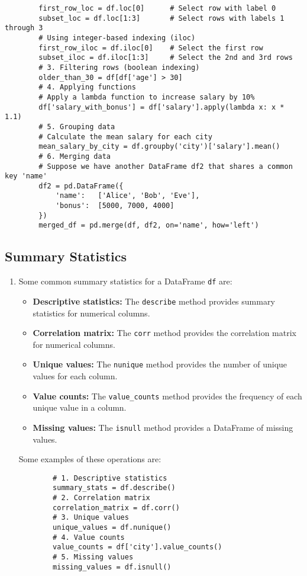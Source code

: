 \documentclass[letterpaper, 11pt]{article}
\newcommand{\1}{\mathds{1}}	%
\theoremstyle{definition}
\begin{document}
\begin{enumerate}
\begin{verbatim}
        first_row_loc = df.loc[0]      # Select row with label 0
        subset_loc = df.loc[1:3]       # Select rows with labels 1 through 3
        # Using integer-based indexing (iloc)
        first_row_iloc = df.iloc[0]    # Select the first row
        subset_iloc = df.iloc[1:3]     # Select the 2nd and 3rd rows
        # 3. Filtering rows (boolean indexing)
        older_than_30 = df[df['age'] > 30]
        # 4. Applying functions
        # Apply a lambda function to increase salary by 10%
        df['salary_with_bonus'] = df['salary'].apply(lambda x: x * 1.1)
        # 5. Grouping data
        # Calculate the mean salary for each city
        mean_salary_by_city = df.groupby('city')['salary'].mean()
        # 6. Merging data
        # Suppose we have another DataFrame df2 that shares a common key 'name'
        df2 = pd.DataFrame({
            'name':   ['Alice', 'Bob', 'Eve'],
            'bonus':  [5000, 7000, 4000]
        })
        merged_df = pd.merge(df, df2, on='name', how='left')
    \end{verbatim}
\end{enumerate}

\subsection{Summary Statistics}
\begin{enumerate}
    \item Some common summary statistics for a DataFrame \texttt{df} are:
    \begin{itemize}
        \item \textbf{Descriptive statistics:} The \texttt{describe} method provides summary statistics for numerical columns.
        \item \textbf{Correlation matrix:} The \texttt{corr} method provides the correlation matrix for numerical columns.
        \item \textbf{Unique values:} The \texttt{nunique} method provides the number of unique values for each column.
        \item \textbf{Value counts:} The \texttt{value\_counts} method provides the frequency of each unique value in a column.
        \item \textbf{Missing values:} The \texttt{isnull} method provides a DataFrame of missing values.
    \end{itemize}
    Some examples of these operations are:
    \begin{verbatim}
        # 1. Descriptive statistics
        summary_stats = df.describe()
        # 2. Correlation matrix
        correlation_matrix = df.corr()
        # 3. Unique values
        unique_values = df.nunique()
        # 4. Value counts
        value_counts = df['city'].value_counts()
        # 5. Missing values
        missing_values = df.isnull()
    \end{verbatim}
\end{enumerate}
\end{document}
